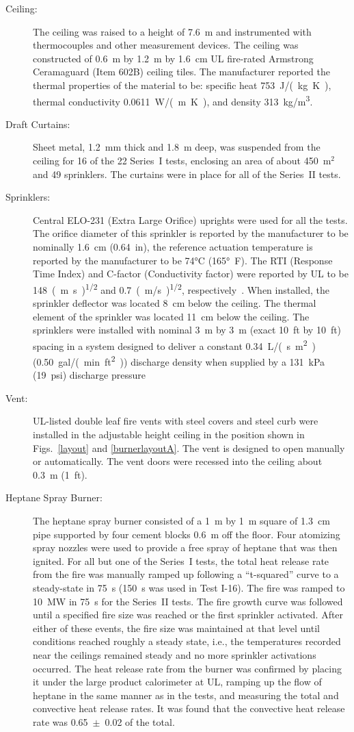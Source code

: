 \begin{description}
\item[Ceiling:] The ceiling was raised to a height of 7.6~m and instrumented with thermocouples and other measurement devices. The ceiling was constructed of 0.6~m by 1.2~m by 1.6~cm UL fire-rated Armstrong Ceramaguard (Item 602B) ceiling tiles. The manufacturer reported the thermal properties of the material to be: specific heat 753~\unit{J/(kg.K)}, thermal conductivity 0.0611~\unit{W/(m.K)}, and density 313~\unit{kg/m^3}.
\item[Draft Curtains:] Sheet metal, 1.2~mm thick and 1.8~m deep, was suspended from the ceiling for 16 of the 22 Series~I tests, enclosing an area of about 450~m$^2$ and 49 sprinklers. The curtains were in place for all of the Series~II tests.
\item[Sprinklers:] Central ELO-231 (Extra Large Orifice) uprights were used for all the tests. The orifice diameter of this sprinkler is reported by the manufacturer to be nominally 1.6~cm (0.64~in), the reference actuation temperature is reported by the manufacturer to be 74\unit{\degreeCelsius} (165\unit{\degree F}). The RTI (Response Time Index) and C-factor (Conductivity factor) were reported by UL to be 148~\unit{(m.s)^{1/2}} and 0.7~\unit{(m/s)^{1/2}}, respectively~\cite{Sheppard:1}. When installed, the sprinkler deflector was located 8~cm below the ceiling. The thermal element of the sprinkler was located 11~cm below the ceiling. The sprinklers were installed with nominal 3~m by 3~m (exact 10~ft by 10~ft) spacing in a system designed to deliver a constant 0.34~\unit{L/(s.m^2)} (0.50~\unit{gal/(min.ft^2)}) discharge density when supplied by a 131~kPa (19~psi) discharge pressure
\item[Vent:] UL-listed double leaf fire vents with steel covers and steel curb were installed in the adjustable height ceiling in the position shown in Figs.~\ref{layout} and \ref{burnerlayoutA}. The vent is designed to open manually or automatically. The vent doors were recessed into the ceiling about 0.3~m (1~ft).
\item[Heptane Spray Burner:] The heptane spray burner consisted of a 1~m by 1~m square of 1.3~cm pipe supported by four cement blocks 0.6~m off the floor. Four atomizing spray nozzles were used to provide a free spray of heptane that was then ignited. For all but one of the Series~I tests, the total heat release rate from the fire was manually ramped up following a ``t-squared'' curve to a steady-state in 75~s (150~s was used in Test I-16). The fire was ramped to 10~MW in 75~s for the Series~II tests. The fire growth curve was followed until a specified fire size was reached or the first sprinkler activated. After either of these events, the fire size was maintained at that level until conditions reached roughly a steady state, i.e., the temperatures recorded near the ceilings remained steady and no more sprinkler activations occurred. The heat release rate from the burner was confirmed by placing it under the large product calorimeter at UL, ramping up the flow of heptane in the same manner as in the tests, and measuring the total and convective heat release rates. It was found that the convective heat release rate was 0.65~$\pm$~0.02 of the total.

\end{description}
